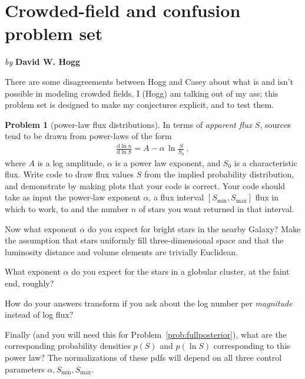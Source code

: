 \documentclass{article}
\theoremstyle{definition}
\newcommand{\problemname}{Problem}
\newtheorem{problem}{\problemname}
\newcommand{\probref}[1]{\problemname~\ref{#1}}
\theoremstyle{remark}
\newcommand{\dd}{\mathrm{d}}
\begin{document}
\section*{Crowded-field and confusion problem set}
\noindent
\textit{by} \textbf{David W. Hogg}

\medskip\noindent
There are some disagreements between Hogg and Casey about what is and isn't possible in modeling crowded fields.
I (Hogg) am talking out of my ass; this problem set is designed to make my conjectures explicit, and to test them.

\begin{problem}[power-law flux distributions]
In terms of \emph{apparent flux} $S$, sources tend to be drawn from power-laws of the form
\begin{align}
    \frac{\dd\ln n}{\dd\ln S} = A - \alpha\,\ln\frac{S}{S_0} ~,
\end{align}
where $A$ is a log amplitude, $\alpha$ is a power law exponent, and $S_0$ is a characteristic flux.
Write code to draw flux values $S$ from the implied probability distribution, and demonstrate by making plots that your code is correct.
Your code should take as input the power-law exponent $\alpha$, a flux interval $[S_{\min}, S_{\max}]$ flux in which to work, to and the number $n$ of stars you want returned in that interval.

Now what exponent $\alpha$ do you expect for bright stars in the nearby Galaxy?
Make the assumption that stars uniformly fill three-dimensional space and that the luminosity distance and volume elements are trivially Euclidean.

What exponent $\alpha$ do you expect for the stars in a globular cluster, at the faint end, roughly?

How do your answers transform if you ask about the log number per \emph{magnitude} instead of log flux?

Finally (and you will need this for \probref{prob:fullposterior}), what are the corresponding probability densities $p(S)$ and $p(\ln S)$ corresponding to this power law?
The normalizations of these pdfs will depend on all three control parameters $\alpha, S_{\min}, S_{\max}$.
\end{problem}
\end{document}
